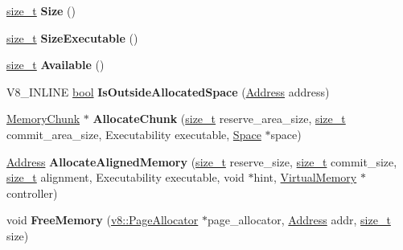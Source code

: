 \begin{DoxyCompactItemize}
\mbox{\hyperlink{classsize__t}{size\+\_\+t}} {\bfseries Size} ()
\item 
\mbox{\label{classv8_1_1internal_1_1MemoryAllocator_a8fe153c012f90aa7a67e93bb8e982c4f}} 
\mbox{\hyperlink{classsize__t}{size\+\_\+t}} {\bfseries Size\+Executable} ()
\item 
\mbox{\label{classv8_1_1internal_1_1MemoryAllocator_aa2f0685d4fd0e3980959eac3b41eddc6}} 
\mbox{\hyperlink{classsize__t}{size\+\_\+t}} {\bfseries Available} ()
\item 
\mbox{\label{classv8_1_1internal_1_1MemoryAllocator_a2f7aca28e7f9bfd922847bad71d30341}} 
V8\+\_\+\+I\+N\+L\+I\+NE \mbox{\hyperlink{classbool}{bool}} {\bfseries Is\+Outside\+Allocated\+Space} (\mbox{\hyperlink{classuintptr__t}{Address}} address)
\item 
\mbox{\label{classv8_1_1internal_1_1MemoryAllocator_aaf116676ecb88c2617bebdb84954ca6f}} 
\mbox{\hyperlink{classv8_1_1internal_1_1MemoryChunk}{Memory\+Chunk}} $\ast$ {\bfseries Allocate\+Chunk} (\mbox{\hyperlink{classsize__t}{size\+\_\+t}} reserve\+\_\+area\+\_\+size, \mbox{\hyperlink{classsize__t}{size\+\_\+t}} commit\+\_\+area\+\_\+size, Executability executable, \mbox{\hyperlink{classv8_1_1internal_1_1Space}{Space}} $\ast$space)
\item 
\mbox{\label{classv8_1_1internal_1_1MemoryAllocator_ac5f086e30959ef26b198a82631cc5029}} 
\mbox{\hyperlink{classuintptr__t}{Address}} {\bfseries Allocate\+Aligned\+Memory} (\mbox{\hyperlink{classsize__t}{size\+\_\+t}} reserve\+\_\+size, \mbox{\hyperlink{classsize__t}{size\+\_\+t}} commit\+\_\+size, \mbox{\hyperlink{classsize__t}{size\+\_\+t}} alignment, Executability executable, void $\ast$hint, \mbox{\hyperlink{classv8_1_1internal_1_1VirtualMemory}{Virtual\+Memory}} $\ast$controller)
\item 
\mbox{\label{classv8_1_1internal_1_1MemoryAllocator_a09600f5b1ca7e4be8337a4d5200bfa01}} 
void {\bfseries Free\+Memory} (\mbox{\hyperlink{classv8_1_1PageAllocator}{v8\+::\+Page\+Allocator}} $\ast$page\+\_\+allocator, \mbox{\hyperlink{classuintptr__t}{Address}} addr, \mbox{\hyperlink{classsize__t}{size\+\_\+t}} size)

\end{DoxyCompactItemize}

